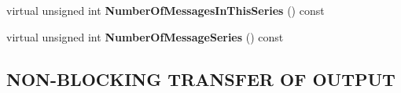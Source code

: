 \begin{DoxyCompactItemize}
\item 
\hypertarget{class_buffered_transformation_a50e09cbbc84c5c1e098c79ca88c42158}{
virtual unsigned int {\bfseries NumberOfMessagesInThisSeries} () const }
\label{class_buffered_transformation_a50e09cbbc84c5c1e098c79ca88c42158}

\item 
\hypertarget{class_buffered_transformation_a37e7c54c2be0451f4a8d395c228b1061}{
virtual unsigned int {\bfseries NumberOfMessageSeries} () const }
\label{class_buffered_transformation_a37e7c54c2be0451f4a8d395c228b1061}

\end{DoxyCompactItemize}
\subsection*{NON-\/BLOCKING TRANSFER OF OUTPUT}
\label{_amgrp75bd0a66a005e812930b7236471ed0a1}
